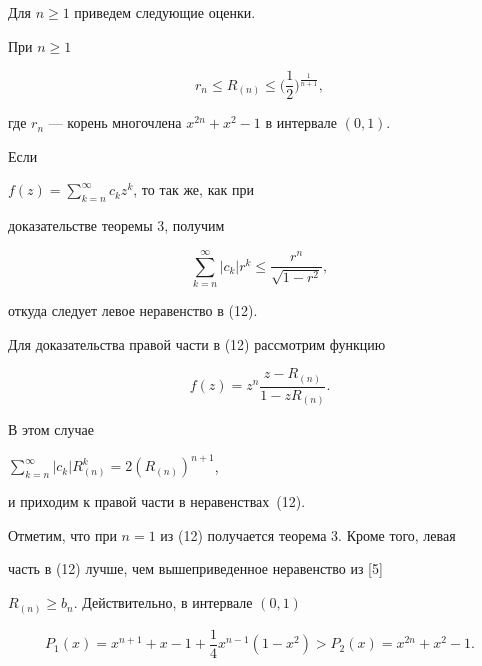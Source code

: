 Для $n\geq1$ приведем следующие оценки.





\begin{thm}


При $n\geq1$


\begin{equation}


r_n\leq R_{(n)}\leq\bigg(\frac{1}{2}\bigg)^{\frac{1}{n+1}},


\end{equation}


где $r_n$ --- корень многочлена $x^{2n}+x^2-1$ в интервале $(0,1)$.


\end{thm}





\begin{pf}


Если


$f(z)=\sum\limits_{k=n}^{\infty}c_kz^k$, то так же, как при


доказательстве теоремы 3, получим


$$


\sum\limits_{k=n}^{\infty}|c_k|r^k\leq\frac{r^n}{\sqrt{1-r^2}},


$$


откуда следует левое неравенство в (12).





Для доказательства правой части в (12) рассмотрим функцию


$$


f(z)= z^n\frac{z-R_{(n)}}{1-zR_{(n)}}.


$$


В этом случае


$\sum\limits_{k=n}^{\infty}|c_k|R_{(n)}^k=2(R_{(n)})^{n+1}$,


и приходим к правой части в неравенствах~(12).


\end{pf}





Отметим, что при $n=1$ из (12) получается теорема 3. Кроме того, левая


часть в (12) лучше, чем вышеприведенное неравенство из [5]


$R_{(n)}\geq b_n$. Действительно, в интервале $(0,1)$


\begin{equation}


P_1(x)=x^{n+1}+x-1+\frac{1}{4}x^{n-1}(1-x^2)>P_2(x)=x^{2n}+x^2-1.


\end{equation}


